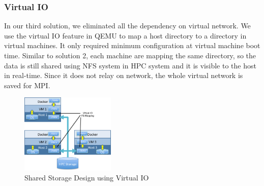 \subsubsection{Virtual IO}
In our third solution, we eliminated all the dependency on virtual network. We use the virtual IO \cite{russell2008virtio} feature in QEMU to map a host directory to a directory in virtual machines. It only required minimum configuration at virtual machine boot time. Similar to solution 2, each machine are mapping the same directory, so the data is still shared using NFS system in HPC system and it is visible to the host in real-time. Since it does not relay on network, the whole virtual network is saved for MPI.
\begin{figure}[h]
    \centering
    \caption{Shared Storage Design using Virtual IO}
    \label{fs3}
    \includegraphics[width=0.4\textwidth]{figures/fs3.pdf}
\end{figure}
